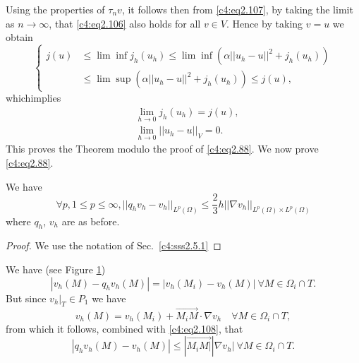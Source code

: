 Using the properties of $\tau_n v$, it follows then from \eqref{c4:eq2.107}, by taking the limit as $n \to \infty$, that \eqref{c4:eq2.106} also holds for all $v \in V$. Hence by taking $v=u$ we obtain 
\begin{equation*}
\begin{cases}
j(u) & \leq \lim \inf j_h(u_h) \leq \lim \inf (\alpha ||u_h - u||^2 + j_h(u_h))\\
& \leq \lim \sup (\alpha ||u_h - u||^2 +j_h(u_h)) \leq j(u),
\end{cases}
\end{equation*}
which\pageoriginale  implies 
\begin{align*}
& \lim_{h \to 0} j_h (u_h) = j(u),\\
& \lim_{h \to 0} ||u_h - u||_V = 0. 
\end{align*}
This proves the Theorem modulo the proof of \eqref{c4:eq2.88}. 
We now prove \eqref{c4:eq2.88}.

\begin{lemma}\label{c4:lem2.6}%
We have 
$$\forall p, 1 \leq p \leq \infty, ||q_h v_h - v_h||_{L^p(\Omega)}
\leq \dfrac{2}{3}h ||\nabla v_h||_{L^p(\Omega) \times L^p(\Omega)}$$  
where $q_h$, $v_h$ are as before.
\end{lemma}

\begin{proof}%
We use the notation of Sec.~\ref{c4:sss2.5.1}
\end{proof}

\begin{figure}[H]
\caption{}\label{c4:fig2.5}
\end{figure} 

We have (see Figure \ref{c4:fig2.5})
\begin{equation}
|v_h (M) - q_h v_h(M)| = |v_h(M_i) - v_h(M)| \ \forall M \in \Omega_i 
\cap T. \tag{2.108}\label{c4:eq2.108}
\end{equation}
But since $v_h|_T \in P_1$ we have
$$
v_h(M) = v_h (M_i)+ \overrightarrow{M_i M} \cdot \nabla v_h \quad 
\forall M \in \Omega_i \cap T,
$$
from which it follows, combined with \eqref{c4:eq2.108}, that 
$$
|q_h v_h(M) - v_h(M)| \leq |\overrightarrow{M_i M|} |\nabla v_h| \ \forall M 
\in \Omega_i \cap T.
$$

